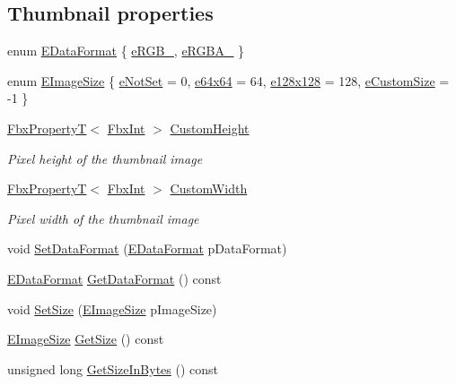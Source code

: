 \subsection*{Thumbnail properties}
\begin{DoxyCompactItemize}
\item 
enum \hyperlink{class_fbx_thumbnail_a60bdaa7e6f78e26f4a8810c552958a0a}{E\+Data\+Format} \{ \hyperlink{class_fbx_thumbnail_a60bdaa7e6f78e26f4a8810c552958a0aacc090b99de3d32c4c5f3a17862d67fe1}{e\+R\+G\+B\+\_}, 
\hyperlink{class_fbx_thumbnail_a60bdaa7e6f78e26f4a8810c552958a0aadeed9af20fc3c7f1c7c42c3aa227b990}{e\+R\+G\+B\+A\+\_}
 \}
\item 
enum \hyperlink{class_fbx_thumbnail_a3d57568544f878eadd9889770443c234}{E\+Image\+Size} \{ \hyperlink{class_fbx_thumbnail_a3d57568544f878eadd9889770443c234a5ab94ccbc01e103dff678afcfab46fae}{e\+Not\+Set} = 0, 
\hyperlink{class_fbx_thumbnail_a3d57568544f878eadd9889770443c234a976078eaa5a0c37434da2722904ce9b5}{e64x64} = 64, 
\hyperlink{class_fbx_thumbnail_a3d57568544f878eadd9889770443c234a5bda1034f4833c3e47ddb7dc46570c6c}{e128x128} = 128, 
\hyperlink{class_fbx_thumbnail_a3d57568544f878eadd9889770443c234a6005dd487093b6fae9367bdf0e46f62d}{e\+Custom\+Size} = -\/1
 \}
\item 
\hyperlink{class_fbx_property_t}{Fbx\+PropertyT}$<$ \hyperlink{fbxtypes_8h_a088fa96de3b0b3ea69f0f6afef525dfb}{Fbx\+Int} $>$ \hyperlink{class_fbx_thumbnail_a42a590e1eb6e45788e3afb50d81824ec}{Custom\+Height}
\begin{DoxyCompactList}\small\item\em Pixel height of the thumbnail image \end{DoxyCompactList}\item 
\hyperlink{class_fbx_property_t}{Fbx\+PropertyT}$<$ \hyperlink{fbxtypes_8h_a088fa96de3b0b3ea69f0f6afef525dfb}{Fbx\+Int} $>$ \hyperlink{class_fbx_thumbnail_a791822f52e133326b3a366ab6cda9757}{Custom\+Width}
\begin{DoxyCompactList}\small\item\em Pixel width of the thumbnail image \end{DoxyCompactList}\item 
void \hyperlink{class_fbx_thumbnail_aa0da5afd782261ee47d9322bacf9a619}{Set\+Data\+Format} (\hyperlink{class_fbx_thumbnail_a60bdaa7e6f78e26f4a8810c552958a0a}{E\+Data\+Format} p\+Data\+Format)
\item 
\hyperlink{class_fbx_thumbnail_a60bdaa7e6f78e26f4a8810c552958a0a}{E\+Data\+Format} \hyperlink{class_fbx_thumbnail_afa2145d5bf482d2200bb6324a1a717bb}{Get\+Data\+Format} () const
\item 
void \hyperlink{class_fbx_thumbnail_a9e4c845718d00e6d133806d13e332059}{Set\+Size} (\hyperlink{class_fbx_thumbnail_a3d57568544f878eadd9889770443c234}{E\+Image\+Size} p\+Image\+Size)
\item 
\hyperlink{class_fbx_thumbnail_a3d57568544f878eadd9889770443c234}{E\+Image\+Size} \hyperlink{class_fbx_thumbnail_a3cda3700f5acd6d80060fc5f7282ffcf}{Get\+Size} () const
\item 
unsigned long \hyperlink{class_fbx_thumbnail_ae1e5944721bf5e835b67767c734fc74a}{Get\+Size\+In\+Bytes} () const
\end{DoxyCompactItemize}
